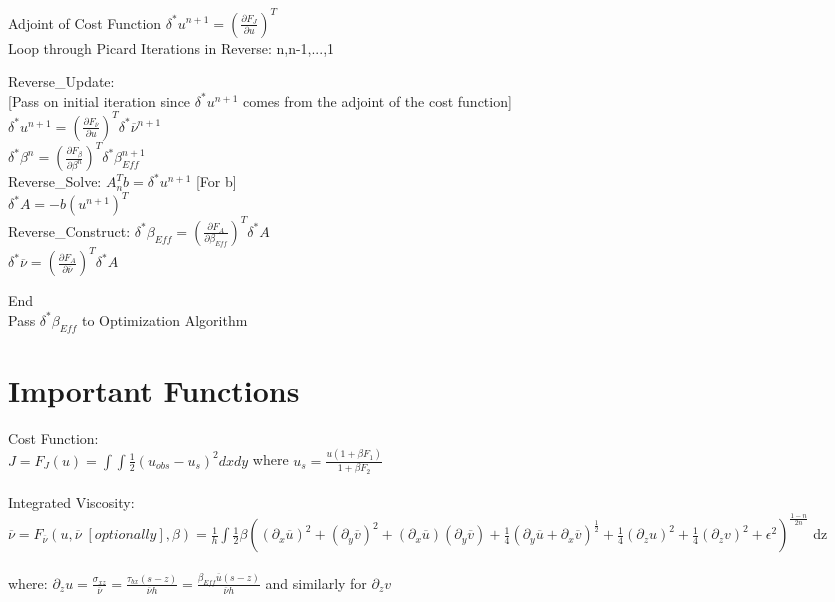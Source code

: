 \documentclass{report}
\begin{document}
Adjoint of Cost Function
$\delta^{*} u^{n+1} = (\frac{ \partial F_{J}}{\partial u})^{T}$\\

Loop through Picard Iterations in Reverse: n,n-1,...,1
\begin{adjustwidth}{2.5em}{0pt}

Reverse\_Update:\\
\hspace*{21.5ex}  [Pass on initial iteration since $\delta^{*} u^{n+1}$ comes from the adjoint of the cost function]\\
\hspace*{21.5ex}  $\delta^{*} u^{n+1} = (\frac{\partial F_{\overline{\nu}}}{\partial u})^{T} \delta^{*}\overline{\nu}^{n+1} $\\
\hspace*{21.5ex}  $\delta^{*} \beta^{n} =  (\frac{\partial F_{\beta}}{\partial \beta^{n}})^{T} \delta^{*}\beta_{Eff}^{n+1} $\\


Reverse\_Solve: \quad\quad\quad $A_{n}^{T} b = \delta^{*} u^{n+1}$ [For b]\\
\hspace*{21.5ex} $\delta^{*}A = -b (u^{n+1})^{T}$\\

Reverse\_Construct: \quad $\delta^{*} \beta_{Eff} = (\frac {\partial F_{A}}{\partial \beta_{Eff}})^{T} \delta^{*} A$\\
\hspace*{21.5ex} $ \delta^{*} \overline{\nu} = (\frac {\partial F_{A}}{\partial \overline{\nu}})^{T} \delta^{*} A$

\end{adjustwidth}
End\\

Pass $\delta^{*} \beta_{Eff}$ to Optimization Algorithm \\

\section*{Important Functions}
Cost Function:\\
$J = F_{J}(u) =  \int \int \frac{1}{2}(u_{obs} - u_{s})^{2} dxdy$ \quad\quad where $u_{s} = \frac{u(1+\beta F_{1})}{1 + \beta F_{2}}$\\\\


Integrated Viscosity:\\  
$\overline{\nu} = F_{\overline{\nu}}(u,\overline{\nu} \; [optionally] ,\beta) =  \frac{1}{h} \int \frac{1}{2} \beta(  (\partial_x \overline{u})^{2} + (\partial_y \overline{v})^{2} + 
							(\partial_x \overline{u})(\partial_y \overline{v}) +
							\frac{1}{4} (\partial_y \overline{u} + \partial_x \overline{v} )^{\frac{1}{2}} +
							\frac{1}{4} (\partial_z u )^{2} + \frac{1}{4} (\partial_z v )^{2} + \epsilon^{2}    )^{\frac{1-n}{2n}}$ dz \\\\
where:
$\partial_z u = \frac{\sigma_{xz}}{\overline{\nu}}	 = \frac{\tau_{bx} (s-z)}{\overline{\nu}h} = \frac{{\beta_{Eff}\overline{u}} (s-z)}{\overline{\nu}h}$ and similarly for $\partial_z v$\\	
							
\end{document}
